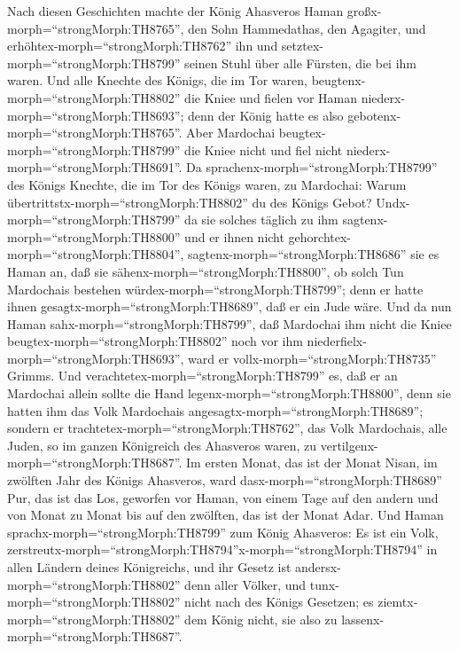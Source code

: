  Nach diesen Geschichten machte der König Ahasveros Haman
großx-morph=``strongMorph:TH8765'', den Sohn Hammedathas, den Agagiter,
und erhöhtex-morph=``strongMorph:TH8762'' ihn und
setztex-morph=``strongMorph:TH8799'' seinen Stuhl über alle Fürsten, die
bei ihm waren.  Und alle Knechte des Königs, die im Tor
waren, beugtenx-morph=``strongMorph:TH8802'' die Kniee und fielen vor
Haman niederx-morph=``strongMorph:TH8693''; denn der König hatte es also
gebotenx-morph=``strongMorph:TH8765''. Aber Mardochai
beugtex-morph=``strongMorph:TH8799'' die Kniee nicht und fiel nicht
niederx-morph=``strongMorph:TH8691''.  Da
sprachenx-morph=``strongMorph:TH8799'' des Königs Knechte, die im Tor
des Königs waren, zu Mardochai: Warum
übertrittstx-morph=``strongMorph:TH8802'' du des Königs Gebot?
 Undx-morph=``strongMorph:TH8799'' da sie solches täglich zu
ihm sagtenx-morph=``strongMorph:TH8800'' und er ihnen nicht
gehorchtex-morph=``strongMorph:TH8804'',
sagtenx-morph=``strongMorph:TH8686'' sie es Haman an, daß sie
sähenx-morph=``strongMorph:TH8800'', ob solch Tun Mardochais bestehen
würdex-morph=``strongMorph:TH8799''; denn er hatte ihnen
gesagtx-morph=``strongMorph:TH8689'', daß er ein Jude wäre. 
Und da nun Haman sahx-morph=``strongMorph:TH8799'', daß Mardochai ihm
nicht die Kniee beugtex-morph=``strongMorph:TH8802'' noch vor ihm
niederfielx-morph=``strongMorph:TH8693'', ward er
vollx-morph=``strongMorph:TH8735'' Grimms.  Und
verachtetex-morph=``strongMorph:TH8799'' es, daß er an Mardochai allein
sollte die Hand legenx-morph=``strongMorph:TH8800'', denn sie hatten ihm
das Volk Mardochais angesagtx-morph=``strongMorph:TH8689''; sondern er
trachtetex-morph=``strongMorph:TH8762'', das Volk Mardochais, alle
Juden, so im ganzen Königreich des Ahasveros waren, zu
vertilgenx-morph=``strongMorph:TH8687''.  Im ersten Monat,
das ist der Monat Nisan, im zwölften Jahr des Königs Ahasveros, ward
dasx-morph=``strongMorph:TH8689'' Pur, das ist das Los, geworfen vor
Haman, von einem Tage auf den andern und von Monat zu Monat bis auf den
zwölften, das ist der Monat Adar.  Und Haman
sprachx-morph=``strongMorph:TH8799'' zum König Ahasveros: Es ist ein
Volk,
zerstreutx-morph=``strongMorph:TH8794''x-morph=``strongMorph:TH8794'' in
allen Ländern deines Königreichs, und ihr Gesetz ist
andersx-morph=``strongMorph:TH8802'' denn aller Völker, und
tunx-morph=``strongMorph:TH8802'' nicht nach des Königs Gesetzen; es
ziemtx-morph=``strongMorph:TH8802'' dem König nicht, sie also zu
lassenx-morph=``strongMorph:TH8687''. 
